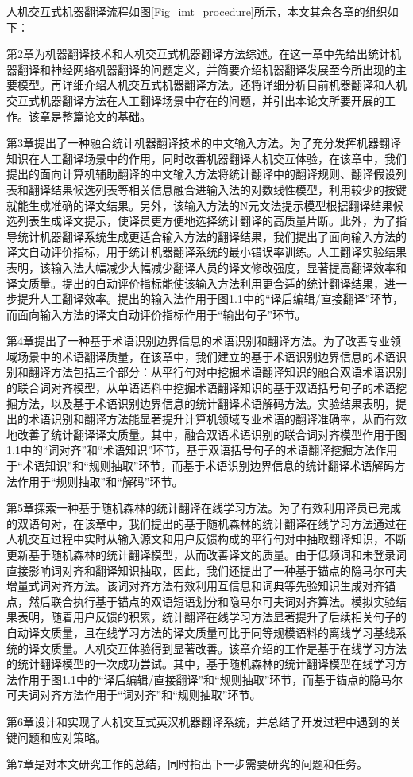 人机交互式机器翻译流程如图\ref{Fig_imt_procedure}所示，本文其余各章的组织如下：

第2章为机器翻译技术和人机交互式机器翻译方法综述。在这一章中先给出统计机器翻译和神经网络机器翻译的问题定义，并简要介绍机器翻译发展至今所出现的主要模型。再详细介绍人机交互式机器翻译方法。还将详细分析目前机器翻译和人机交互式机器翻译方法在人工翻译场景中存在的问题，并引出本论文所要开展的工作。该章是整篇论文的基础。

第3章提出了一种融合统计机器翻译技术的中文输入方法。为了充分发挥机器翻译知识在人工翻译场景中的作用，同时改善机器翻译人机交互体验，在该章中，我们提出的面向计算机辅助翻译的中文输入方法将统计翻译中的翻译规则、翻译假设列表和翻译结果候选列表等相关信息融合进输入法的对数线性模型，利用较少的按键就能生成准确的译文结果。另外，该输入方法的N元文法提示模型根据翻译结果候选列表生成译文提示，使译员更方便地选择统计翻译的高质量片断。此外，为了指导统计机器翻译系统生成更适合输入方法的翻译结果，我们提出了面向输入方法的译文自动评价指标，用于统计机器翻译系统的最小错误率训练。人工翻译实验结果表明，该输入法大幅减少大幅减少翻译人员的译文修改强度，显著提高翻译效率和译文质量。提出的自动评价指标能使该输入方法利用更合适的统计翻译结果，进一步提升人工翻译效率。提出的输入法作用于图1.1中的“译后编辑/直接翻译”环节，而面向输入方法的译文自动评价指标作用于“输出句子”环节。

第4章提出了一种基于术语识别边界信息的术语识别和翻译方法。为了改善专业领域场景中的术语翻译质量，在该章中，我们建立的基于术语识别边界信息的术语识别和翻译方法包括三个部分：从平行句对中挖掘术语翻译知识的融合双语术语识别的联合词对齐模型，从单语语料中挖掘术语翻译知识的基于双语括号句子的术语挖掘方法，以及基于术语识别边界信息的统计翻译术语解码方法。实验结果表明，提出的术语识别和翻译方法能显著提升计算机领域专业术语的翻译准确率，从而有效地改善了统计翻译译文质量。其中，融合双语术语识别的联合词对齐模型作用于图1.1中的“词对齐”和“术语知识”环节，基于双语括号句子的术语翻译挖掘方法作用于“术语知识”和“规则抽取”环节，而基于术语识别边界信息的统计翻译术语解码方法作用于“规则抽取”和“解码”环节。

第5章探索一种基于随机森林的统计翻译在线学习方法。为了有效利用译员已完成的双语句对，在该章中，我们提出的基于随机森林的统计翻译在线学习方法通过在人机交互过程中实时从输入源文和用户反馈构成的平行句对中抽取翻译知识，不断更新基于随机森林的统计翻译模型，从而改善译文的质量。由于低频词和未登录词直接影响词对齐和翻译知识抽取，因此，我们还提出了一种基于锚点的隐马尔可夫增量式词对齐方法。该词对齐方法有效利用互信息和词典等先验知识生成对齐锚点，然后联合执行基于锚点的双语短语划分和隐马尔可夫词对齐算法。模拟实验结果表明，随着用户反馈的积累，统计翻译在线学习方法显著提升了后续相关句子的自动译文质量，且在线学习方法的译文质量可比于同等规模语料的离线学习基线系统的译文质量。人机交互体验得到显著改善。该章介绍的工作是基于在线学习方法的统计翻译模型的一次成功尝试。其中，基于随机森林的统计翻译模型在线学习方法作用于图1.1中的“译后编辑/直接翻译”和“规则抽取”环节，而基于锚点的隐马尔可夫词对齐方法作用于“词对齐”和“规则抽取”环节。

第6章设计和实现了人机交互式英汉机器翻译系统，并总结了开发过程中遇到的关键问题和应对策略。

第7章是对本文研究工作的总结，同时指出下一步需要研究的问题和任务。
